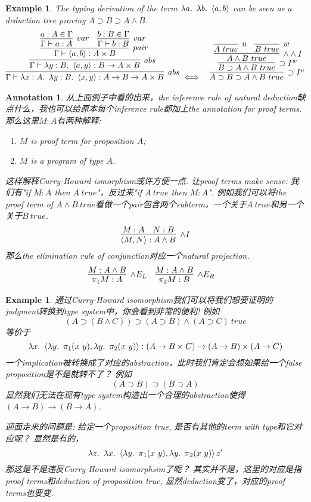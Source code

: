 \documentclass{article}
\theoremstyle{plain}
\newtheorem{example}[theorem]{Example}
\newtheorem{annotation}[theorem]{Annotation}
\theoremstyle{nonumberplain}
\newcommand{\lam}[2]{\ensuremath{\lambda #1\ldotp~ #2}} %
\begin{document}
\begin{example}
\rm The typing derivation of the term $\lam{a}{\lam{b}{\left<a,b\right>}}$ can be seen as a deduction tree proving $A \supset B \supset A \wedge B$.
\[
\begin{aligned}
	\infer[abs]{\Gamma\vdash\lam{x:A}{\lam{y:B}{\left<x,y\right>}}:A \to B \to A \times B}{\infer[abs]{\Gamma\vdash \lam{y:B}{\left<a,y\right>}:B \to A \times B}{\infer[pair]{\Gamma\vdash \left<a,b\right>: A \times B}{\infer[var]{\Gamma\vdash a:A}{a:A \in \Gamma} & \infer[var]{\Gamma\vdash b:B}{b:B \in \Gamma}}}} & \iff & 
	\infer[\supset I^u]{A \supset B \supset A \wedge B~true}{\infer[\supset I^w]{B \supset A \wedge B~true}{\infer[\wedge \wedge I]{A \wedge B ~true}{\infer[u]{A~true}{} & \infer[w]{B~true}{}}}}		
\end{aligned}
\]
\end{example}

\begin{annotation}
\rm 从上面例子中看的出来，the inference rule of natural deduction缺点什么，我也可以给原本每个inference rule都加上the annotation for proof terms. \cite{FP-pap}那么这里$M:A$有两种解释:
\begin{enumerate}
	\item $M$ is proof term for proposition $A$;
	\item $M$ is a program of type $A$. 
\end{enumerate}
这样解释Curry-Howard ismorphism或许方便一点. 让proof terms make sense: 我们有"if $M:A$ then $A~true$"，反过来"if $A~true$ then $M:A$". 例如我们可以将the proof term of $A \wedge B~true$看做一个pair包含两个subterm，一个关于$A~true$和另一个关于$B~true$.
$$
\infer[\wedge I]{\left<M,N\right>: A \wedge B}{M:A & N:B}
$$
那么the elimination rule of conjunction对应一个natural projection.
$$
\begin{aligned}
\infer[\wedge E_L]{\pi_1 M:A}{M:A \wedge B} &&& \infer[\wedge E_R]{\pi_2 M:B}{M:A \wedge B} 
\end{aligned}
$$ 
\end{annotation}


\begin{example}
\rm 通过Curry-Howard isomorphism我们可以将我们想要证明的judgment转换到type system中，你会看到非常的便利! 例如
$$
(A \supset (B \wedge C)) \supset (A \supset B) \wedge (A \supset C)~true
$$
等价于
$$
\lam{x}{\left<\lam{y}{\pi_1(x~y)},\lam{y}{\pi_2(x~y)} \right>}: (A \to B \times C) \to (A \to B) \times (A \to C)
$$
一个implication被转换成了对应的abstraction，此时我们肯定会想如果给一个false proposition是不是就转不了？ 例如
$$
(A \supset B) \supset (B \supset A)
$$
显然我们无法在现有type system构造出一个合理的abstraction使得$(A \to B) \to (B \to A)$.

迎面走来的问题是: 给定一个proposition true, 是否有其他的term with type和它对应呢？ 显然是有的，
$$
\lam{z}{\lam{x}{\left<\lam{y}{\pi_1(x~y)},\lam{y}{\pi_2(x~y)} \right>}}z'
$$
那这是不是违反Curry-Howard isomorphsim了呢？ 其实并不是，这里的对应是指proof terms和deduction of proposition true,  显然deduction变了，对应的proof terms也要变. 
\end{example}
\end{document}
